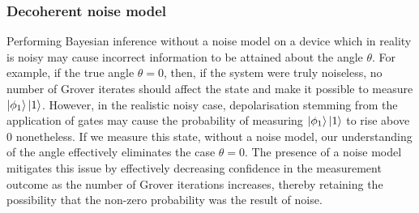 
\subsubsection{Decoherent noise model}

Performing Bayesian inference without a noise model on a device which in reality is noisy may cause incorrect information to be attained about the angle $\theta$. For example, if the true angle $\theta = 0$, then, if the system were truly noiseless, no number of Grover iterates should affect the state and make it possible to measure $\ket{\phi_1} \ket{1}$. However, in the realistic noisy case, depolarisation stemming from the application of gates may cause the probability of measuring $\ket{\phi_1} \ket{1}$ to rise above $0$ nonetheless. If we measure this state, without a noise model, our understanding of the angle effectively eliminates the case $\theta = 0$. The presence of a noise model mitigates this issue by effectively decreasing confidence in the measurement outcome as the number of Grover iterations increases, thereby retaining the possibility that the non-zero probability was the result of noise.

